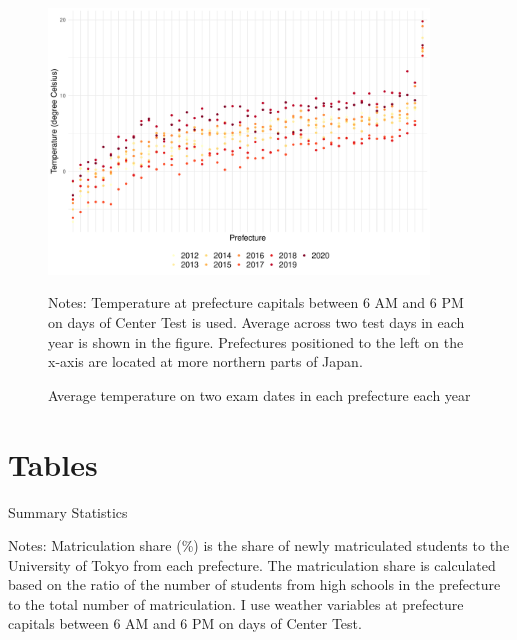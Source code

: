 \documentclass[12pt,letterpaper]{article}
\begin{document}
\begin{figure}[H]
  \centering
  \caption{Average temperature on two exam dates in each prefecture each year}
  \includegraphics[width = 0.9\textwidth]{../Output/images/temperature_diff.pdf}
  \label{fig:temperature_diff}
  \footnotesize
  \begin{tablenotes}
    \item Notes:
      Temperature at prefecture capitals between 6 AM and 6 PM on days of Center Test is used.
      Average across two test days in each year is shown in the figure.
      Prefectures positioned to the left on the x-axis are located at more northern parts of Japan.
  \end{tablenotes}
\end{figure}

\section{Tables}

\begin{table}[H]
  \centering
  \caption{Summary Statistics}
  \resizebox{0.8\linewidth}{!}{
  
  }
  \label{tab:sum_stat}
  \footnotesize
  \begin{tablenotes}
    \item 
      Notes:
      Matriculation share (\%) is the share of newly matriculated students to the University of Tokyo from each prefecture.
      The matriculation share is calculated based on the ratio of the number of students from high schools in the prefecture to the total number of matriculation.
      I use weather variables at prefecture capitals between 6 AM and 6 PM on days of Center Test.
  \end{tablenotes}
\end{table}
\end{document}
